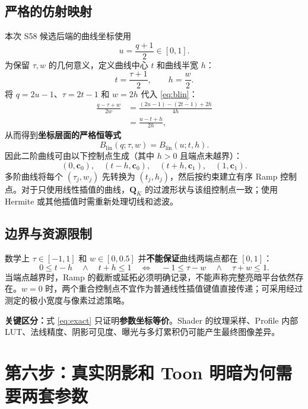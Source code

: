 \documentclass[UTF8,11pt,a4paper]{ctexart}
\numberwithin{equation}{section}
\begin{document}
\subsection{严格的仿射映射}
本次 S58 候选后端的曲线坐标使用
\begin{equation}
u=\frac{q+1}{2}\in[0,1].
\label{eq:coord}
\end{equation}
为保留 $\tau,w$ 的几何意义，定义曲线中心 $t$ 和曲线半宽 $h$：
\begin{equation}
\boxed{t=\frac{\tau+1}{2},\qquad h=\frac{w}{2}.}
\label{eq:map}
\end{equation}
将 $q=2u-1$、$\tau=2t-1$ 和 $w=2h$ 代入 \eqref{eq:blin}：
\begin{align}
\frac{q-\tau+w}{2w}
&=\frac{(2u-1)-(2t-1)+2h}{4h}\\
&=\frac{u-t+h}{2h},
\end{align}
从而得到\textbf{坐标层面的严格恒等式}
\begin{equation}
\boxed{B_{\mathrm{lin}}(q;\tau,w)=B_{\mathrm{lin}}(u;t,h).}
\label{eq:exact}
\end{equation}
因此二阶曲线可由以下控制点生成（其中 $h>0$ 且端点未越界）：
\begin{equation}
(0,\mathbf c_0),\quad(t-h,\mathbf c_0),\quad
(t+h,\mathbf c_1),\quad(1,\mathbf c_1).
\label{eq:knots}
\end{equation}
多阶曲线将每个 $(\tau_j,w_j)$ 先转换为 $(t_j,h_j)$，然后按约束建立有序 Ramp 控制点。对于只使用线性插值的曲线，$\mathbf Q_K$ 的过渡形状与该组控制点一致；使用 Hermite 或其他插值时需重新处理切线和滤波。

\subsection{边界与资源限制}
数学上 $\tau\in[-1,1]$ 和 $w\in[0,0.5]$ 并\textbf{不能保证}曲线两端点都在 $[0,1]$：
\begin{equation}
0\le t-h\quad\land\quad t+h\le1
\quad\Longleftrightarrow\quad
-1\le\tau-w\quad\land\quad\tau+w\le1.
\end{equation}
当端点越界时，Ramp 的截断或延拓必须明确记录，不能声称完整亮暗平台依然存在。$w=0$ 时，两个重合控制点不宜作为普通线性插值键值直接传递；可采用经过测定的极小宽度与像素过滤策略。

\textbf{关键区分：}式 \eqref{eq:exact} 只证明\textbf{参数坐标等价}。Shader 的纹理采样、Profile 内部 LUT、法线精度、阴影可见度、曝光与多灯累积仍可能产生最终图像差异。

\section{第六步：真实阴影和 Toon 明暗为何需要两套参数}
\end{document}
